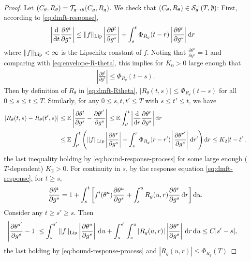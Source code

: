 \begin{proof}
Let $(C_\theta,R_\theta)=\mathcal{T}_{g \to \theta}(C_g,R_g)$.
We check that $(C_\theta,R_\theta) \in \mathcal{S}_\theta^+(T,\emptyset)$:
First, according to \eqref{eq:dmft-response},
\begin{align*}
 & \left| \frac{\mathrm{d} }{\mathrm{d} t} \frac{\partial \theta^t}{\partial g^s}\right|
 \leq \|f\|_{\mathrm{Lip}} \left| \frac{\partial \theta^t}{\partial g^s}\right| + \int_s^t
\Phi_{R_g}(t-r) \left|\frac{\partial\theta^r}{\partial g^s}\right|\mathrm{d} r
\end{align*} 
where $\|f\|_{\mathrm{Lip}}<\infty$ is the Lipschitz constant of $f$.
Noting that $\frac{\partial \theta^s}{\partial g^s}=1$ and
comparing with \eqref{eq:envelope-R-theta}, this implies for $K_0>0$ large enough
that
\begin{align}\label{eq:bound-response-process} 
\left|\frac{\partial \theta^t}{\partial g^s}\right| \leq \Phi_{R_\theta}(t-s).
\end{align}
Then by definition of $R_\theta$ in \eqref{eq:dmft-Rtheta},
$|R_\theta(t,s)| \le \Phi_{R_\theta}(t-s)$ for all $0\le s\le t\le T$.
Similarly, for any $0 \le s,t,t' \le T$ with $s \leq t' \leq t$, we have
\begin{align}
    |R_\theta(t,s) - R_\theta(t',s)| &\le \mathbb{E}\left|\frac{\partial
\theta^t}{\partial g^s} - \frac{\partial \theta^{t'}}{\partial g^s}\right| \le
\mathbb{E} \int_{t'}^t \left| \frac{\mathrm{d} }{\mathrm{d} r} \frac{\partial \theta^r}{\partial g^s}
\right|\mathrm{d} r\notag\\
    &\le \mathbb{E} \int_{t'}^t \left(\|f\|_{\mathrm{Lip}} \left| \frac{\partial
\theta^r}{\partial g^s}\right| +  \int_s^r \Phi_{R_g}(r-r')
\left|\frac{\partial\theta^{r'}}{\partial g^s}\right|\mathrm{d} r'\right)\mathrm{d} r
    \le K_2|t-t'|,\label{eq:Rthetacontt}
\end{align}
the last inequality holding by \eqref{eq:bound-response-process} for some
large enough ($T$-dependent) $K_2>0$.
For continuity in \(s\), by the response equation \eqref{eq:dmft-response}, for
\(t \ge s\),
\[
\frac{\partial \theta^t}{\partial g^s}
=
1+
\int_s^t
\left[
f'(\theta^u)\frac{\partial \theta^u}{\partial g^s}
+
\int_s^u R_g(u,r)\frac{\partial \theta^r}{\partial g^s}\,\mathrm{d} r
\right]\mathrm{d} u.
\]
Consider any $t \geq s' \geq s$. Then
\[
\begin{aligned}
\left|
\frac{\partial \theta^{s'}}{\partial g^s}-1
\right|
&\le
\int_s^{s'}
\|f\|_{\mathrm{Lip}} \left|\frac{\partial \theta^u}{\partial g^s}\right|\,\mathrm{d} u
+
\int_s^{s'}\int_s^u |R_g(u,r)|
\left|\frac{\partial \theta^r}{\partial g^s}\right|
\,\mathrm{d} r\,\mathrm{d} u  \le C |s'-s|,
\end{aligned}
\]
the last holding by
\eqref{eq:bound-response-process} and $|R_g(u,r)| \le \Phi_{R_g}(T)$

\end{proof}
